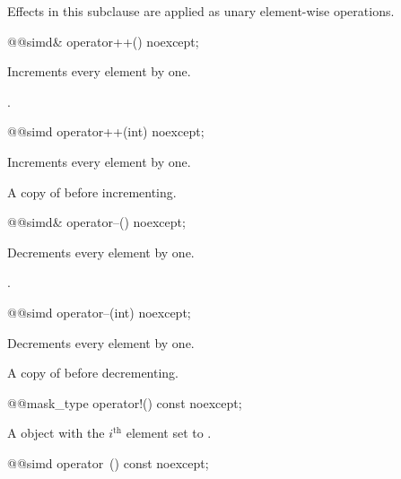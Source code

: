 \pnum
Effects in this subclause are applied as unary element-wise operations.

\begin{itemdecl}
@@simd& operator++() noexcept;
\end{itemdecl}

\begin{itemdescr}
  \pnum\effects
  Increments every element by one.

  \pnum\returns
  .
\end{itemdescr}

\begin{itemdecl}
@@simd operator++(int) noexcept;
\end{itemdecl}

\begin{itemdescr}
  \pnum\effects
  Increments every element by one.

  \pnum\returns
  A copy of  before incrementing.
\end{itemdescr}

\begin{itemdecl}
@@simd& operator--() noexcept;
\end{itemdecl}

\begin{itemdescr}
  \pnum\effects
  Decrements every element by one.

  \pnum\returns
  .
\end{itemdescr}

\begin{itemdecl}
@@simd operator--(int) noexcept;
\end{itemdecl}

\begin{itemdescr}
  \pnum\effects
  Decrements every element by one.

  \pnum\returns
  A copy of  before decrementing.
\end{itemdescr}

\begin{itemdecl}
@@mask_type operator!() const noexcept;
\end{itemdecl}

\begin{itemdescr}
  \pnum\returns
  A  object with the $i^\text{th}$ element set to  \foralli.
\end{itemdescr}

\begin{itemdecl}
@@simd operator~() const noexcept;
\end{itemdecl}

